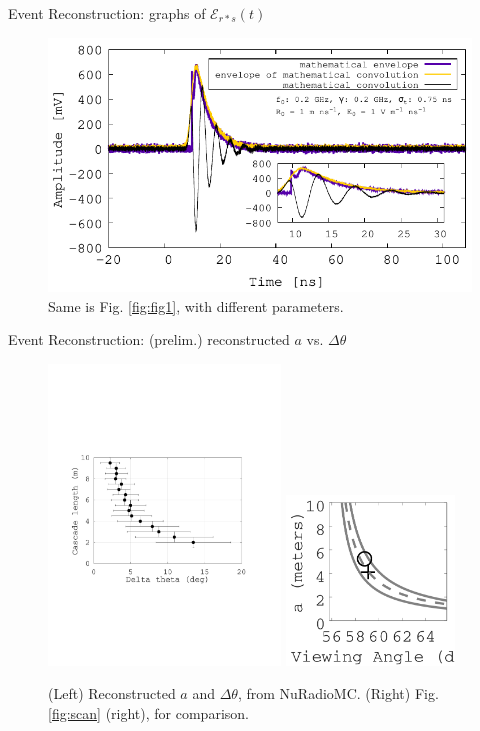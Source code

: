 \documentclass{beamer}
\begin{document}
\begin{frame}[fragile]{Event Reconstruction: graphs of $\mathcal{E}_{r * s}(t)$}
\begin{figure}
\centering
\includegraphics[width=\textwidth]{March12_plot2.pdf}
\caption{\footnotesize \label{fig:fig2} Same is Fig. \ref{fig:fig1}, with different parameters.}
\end{figure}
\end{frame}

\begin{frame}[fragile]{Event Reconstruction: (prelim.) reconstructed $a$ vs. $\Delta\theta$}
\begin{figure}
\centering
\includegraphics[width=0.55\textwidth,height=0.5\textwidth,trim=0cm 7cm 3cmcm 5cm,clip=true]{March14_plot1.pdf}
\includegraphics[width=0.4\textwidth]{scan_grab.png}
\caption{\footnotesize \label{fig:fig3} (Left) Reconstructed $a$ and $\Delta\theta$, from NuRadioMC. (Right) Fig. \ref{fig:scan} (right), for comparison.}
\end{figure}
\end{frame}
\end{document}
